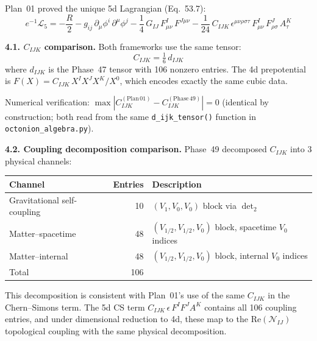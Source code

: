 Plan~01 proved the unique 5d Lagrangian (Eq.~53.7):
\begin{equation}\label{eq:53.7-recall}
  e^{-1}\mathcal{L}_5 = -\frac{R}{2}
    - g_{ij}\,\partial_\mu\phi^i\,\partial^\mu\phi^j
    - \frac{1}{4}\,G_{IJ}\,F^I_{\mu\nu}\,F^{J\mu\nu}
    - \frac{1}{24}\,C_{IJK}\,\epsilon^{\mu\nu\rho\sigma\tau}\,
      F^I_{\mu\nu}\,F^J_{\rho\sigma}\,A^K_\tau
\end{equation}

\textbf{4.1. $C_{IJK}$ comparison.}
Both frameworks use the same tensor:
$$
  C_{IJK} = \tfrac{1}{6}\,d_{IJK}
$$
where $d_{IJK}$ is the Phase~47 tensor with 106 nonzero entries.
The 4d prepotential is $F(X) = C_{IJK}\,X^I X^J X^K / X^0$, which
encodes exactly the same cubic data.

Numerical verification: $\max|C_{IJK}^{(\mathrm{Plan\,01})}
- C_{IJK}^{(\mathrm{Phase\,49})}| = 0$ (identical by construction;
both read from the same \texttt{d\_ijk\_tensor()} function in
\texttt{octonion\_algebra.py}).

\textbf{4.2. Coupling decomposition comparison.}
Phase~49 decomposed $C_{IJK}$ into 3 physical channels:
\begin{center}
\begin{tabular}{lrl}
\hline
Channel & Entries & Description \\
\hline
Gravitational self-coupling & 10 & $(V_1, V_0, V_0)$ block via $\det_2$ \\
Matter--spacetime & 48 & $(V_{1/2}, V_{1/2}, V_0)$ block, spacetime $V_0$ indices \\
Matter--internal & 48 & $(V_{1/2}, V_{1/2}, V_0)$ block, internal $V_0$ indices \\
\hline
Total & 106 & \\
\hline
\end{tabular}
\end{center}
This decomposition is consistent with Plan~01's use of the same
$C_{IJK}$ in the Chern--Simons term. The 5d CS term
$C_{IJK}\,\epsilon\,F^I F^J A^K$ contains all 106 coupling entries,
and under dimensional reduction to 4d, these map to the
$\mathrm{Re}(\mathcal{N}_{IJ})$ topological coupling with the
same physical decomposition.

